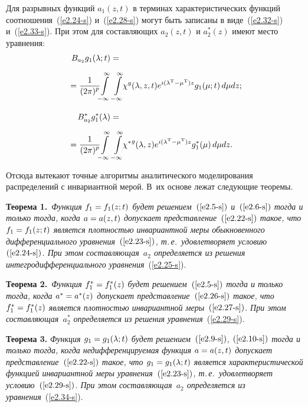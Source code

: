 \begin{multicols}{2}
Для разрывных функций $a_1 (z,t)$ в терминах характеристических функций
соотношения~(\ref{e2.24-s}) и~(\ref{e2.28-s}) могут быть записаны в
виде~(\ref{e2.32-s}) и~(\ref{e2.33-s}). При этом для
составляющих $a_2(z,t)$ и $a_2^*(z)$ имеют место уравнения:
    \begin{align}
    B_{a_2} g_1(\la;t) &=\notag\\[6pt]
    &\hspace*{-18mm}{}=\fr{1}{(2\pi)^p}\! \!\iin\iin\!\! \chi^g(\la,z,t)
    e^{i(\la^{\mathrm{T}}-\mu^{\mathrm{T}})z} g_1(\mu;t)\, d\mu dz;\!\!\!
    \label{e2.34-s}\\[9pt]
    B_{a_2}^* g_1^*(\la) &={}\notag\\[6pt]
    &\hspace*{-18mm}{}=\fr{1}{(2\pi)^p} \!\!\iin\iin \!\!{\chi^*}^g(\la,z)
    e^{i(\la^{\mathrm{T}}-\mu^{\mathrm{T}})z} g_1^*(\mu)\, d\mu dz.\!\!\!
    \label{e2.35-s}
\end{align}

Отсюда вытекают  точные алгоритмы аналитического
моделирования распределений с инвариантной мерой. В~их основе лежат
следующие тео\-ремы.
{

}

\smallskip

\noindent
\textbf{Теорема 1.}\ \textit{Функция $f_1\hm=f_1(z;t)$ будет решением~$(\ref{e2.5-s})$
и~$(\ref{e2.6-s})$ тогда и только тогда, когда $a\hm=a(z,t)$ допускает
представление~$(\ref{e2.22-s})$ такое, что $f_1\hm=f_1(z;t)$ \mbox{является} плотностью
инвариантной меры обыкновенного дифференциального уравнения~$(\ref{e2.23-s})$,
т.\,е.\ удовле\-тво\-ря\-ет условию~$(\ref{e2.24-s})$. При этом со\-став\-ля\-ющая~$a_2$
определяется из решения интегродифференциального уравнения}~(\ref{e2.25-s}).

\smallskip

\noindent
\textbf{Теорема 2.}\ \textit{Функция $f_1^*\hm=f_1^*(z)$ будет решением~$(\ref{e2.5-s})$
тогда и только тогда, когда $a^*\hm=a^*(z)$ допускает
представление~$(\ref{e2.26-s})$ такое, что $f_1^*\hm=f_1^*(z)$ является плотностью
инвариантной меры~$(\ref{e2.27-s})$. При этом составляющая~$a_2^{*}$
определяется из решения  уравнения}~(\ref{e2.29-s}).

\smallskip

\noindent
\textbf{Теорема 3.} \textit{Функция $g_1\hm=g_1(\la;t)$ будет решением~$(\ref{e2.9-s})$,
$(\ref{e2.10-s})$ тогда и только тогда, когда недифференцируемая функция
$a\hm=a(z,t)$  допускает пред\-став\-ле\-ние~$(\ref{e2.22-s})$ такое, что
$g_1\hm=g_1(\la;t)$ является характеристической функцией инвариантной
меры уравнения~$(\ref{e2.23-s})$, т.\,е.\
удовлетворяет условию~$(\ref{e2.29-s})$. При этом
со\-став\-ля\-ющая~$a_2$ определяется из уравнения}~(\ref{e2.34-s}).


\end{multicols}
